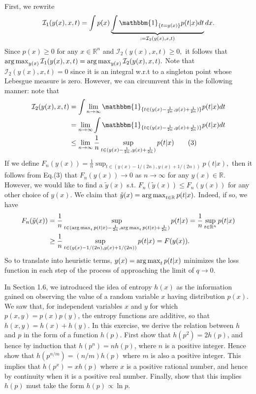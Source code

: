 First, we rewrite 
\[
\mathcal{I}_{1}(y(x),x,t)=\int p(x)\underbrace{\int\mathbbm{1}_{\{t=y(x)\}}p(t\vert x)dt}_{:=\mathcal{I}_{2}(y(x),x,t)}dx.
\]
Since $p(x)\geq0$ for any $x\in\mathbb{R}^{n}$ and $\mathcal{I}_{2}(y(x),x,t)\geq0,$
it follows that $\operatorname*{arg\,max}_{y(x)}\mathcal{I}_{1}(y(x),x,t)=\operatorname*{arg\,max}_{y(x)}\mathcal{I}_{2}(y(x),x,t).$
Note that $\mathcal{I}_{2}(y(x),x,t)=0$ since it is an integral w.r.t
to a singleton point whose Lebesgue measure is zero. However, we can
circumvent this in the following manner: note that 
\begin{align*}
\mathcal{I}_{2}(y(x),x,t) & =\int\lim_{n\rightarrow\infty}\mathbbm{1}_{\{t\in(y(x)-\frac{1}{2n},y(x)+\frac{1}{2n})\}}p(t\vert x)dt\\
 & =\lim_{n\rightarrow\infty}\int\mathbbm{1}_{\{t\in(y(x)-\frac{1}{2n},y(x)+\frac{1}{2n})\}}p(t\vert x)dt\\
 & \leq\lim_{n\rightarrow\infty}\frac{1}{n}\sup_{t\in(y(x)-\frac{1}{2n},y(x)+\frac{1}{2n})}p(t\vert x)\tag{3}
\end{align*}
If we define $F_{n}(y(x))=\frac{1}{n}\sup_{t\in(y(x)-1/(2n),y(x)+1/(2n))}p(t\vert x),$
then it follows from Eq.(3) that $F_{n}(y(x))\rightarrow0$ as $n\rightarrow\infty$
for any $y(x)\in\mathbb{R}$. However, we would like to find a $\tilde{y}(x)$
s.t. $F_{n}(\tilde{y}(x))\leq F_{n}(y(x))$ for any other choice of
$y(x).$ We claim that $\tilde{y}(x)=\operatorname*{arg\,max}_{t\in\mathbb{R}}p(t\vert x).$
Indeed, if so, we have 
\begin{align*}
F_{n}(\tilde{y}(x)) & =\frac{1}{n}\sup_{t\in(\operatorname*{arg\,max}_{t}p(t\vert x)-\frac{1}{2n},\operatorname*{arg\,max}_{t}p(t\vert x)+\frac{1}{2n})}p(t\vert x)=\frac{1}{n}\sup_{t\in\mathbb{R}^{n}}p(t\vert x)\\
 & \geq\frac{1}{n}\sup_{t\in(y(x)-1/(2n),y(x)+1/(2n))}p(t\vert x)=F(y(x)).
\end{align*}
So to translate into heuristic terms, $y(x)=\operatorname*{arg\,max}_{t}p(t\vert x)$
minimizes the loss function in \textquotedbl each step\textquotedbl{}
of the process of \textquotedbl approaching the limit of $q\rightarrow0$\textquotedbl .
\\

\begin{cBoxA}{}
 In Section 1.6, we introduced the idea of entropy $h(x)$ as the
information gained on observing the value of a random variable $x$
having distribution $p(x)$. We saw that, for independent variables
$x$ and $y$ for which $p(x,y)=p(x)p(y)$, the entropy functions
are additive, so that $h(x,y)=h(x)+h(y)$. In this exercise, we derive
the relation between $h$ and $p$ in the form of a function $h(p)$.
First show that $h(p^{2})=2h(p)$, and hence by induction that $h(p^{n})=nh(p)$,
where $n$ is a positive integer. Hence show that $h(p^{n/m})=(n/m)h(p)$
where $m$ is also a positive integer. This implies that $h(p^{x})=xh(p)$
where $x$ is a positive rational number, and hence by continuity
when it is a positive real number. Finally, show that this implies
$h(p)$ must take the form $h(p)\propto\ln p$. 
\end{cBoxA}

